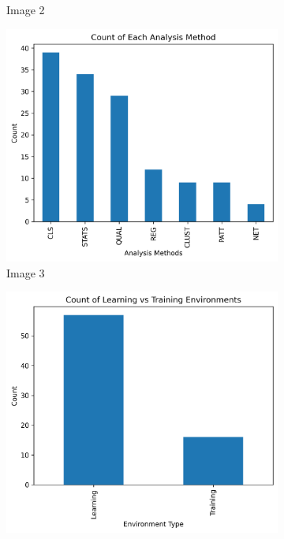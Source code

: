 \documentclass[manuscript,screen,review]{acmart}
\begin{document}
\begin{figure}[htbp]
\begin{subfigure}[b]{0.45\textwidth}
        \caption{Image 2}
    \end{subfigure}
    \hfill
    \begin{subfigure}[b]{0.45\textwidth}
        \includegraphics[width=\textwidth]{img/statistical_imgs/analysis_type.png}
        \caption{Image 3}
    \end{subfigure}
    \hfill
    \begin{subfigure}[b]{0.45\textwidth}
        \includegraphics[width=\textwidth]{img/statistical_imgs/learning_vs_training_envs.png}

\end{subfigure}
\end{figure}
\end{document}
